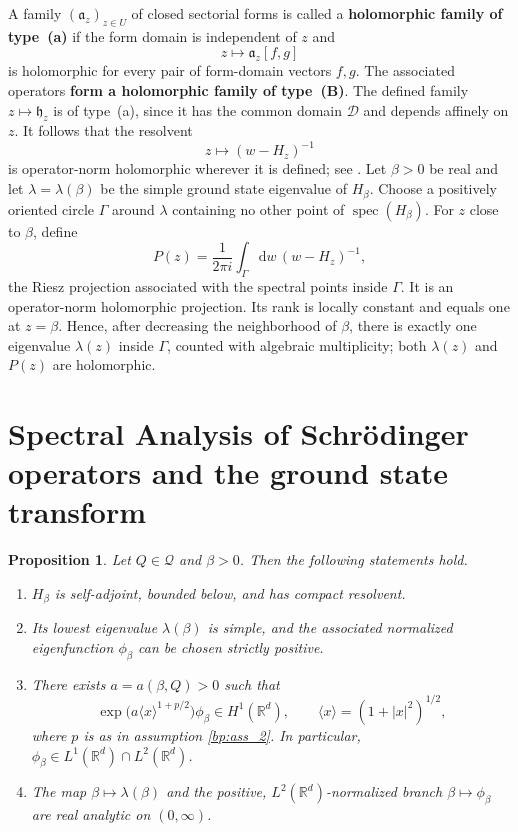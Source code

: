\documentclass[11pt,reqno]{amsart}
\newtheorem{proposition}[theorem]{Proposition}
\theoremstyle{definition}
\numberwithin{equation}{section}
\newcommand{\<}{\langle}
\renewcommand{\>}{\rangle}
\def\de{{\rm d}}
\def\de{{\mathrm {d}}}
\begin{document}
\begin{appendix}
A family $(\mathfrak a_z)_{z\in U}$ of closed sectorial forms is called a
\textbf{holomorphic family of type~(a)} if the form domain is independent of $z$ and
\[
       z\longmapsto\mathfrak a_z[f,g]
\]
is holomorphic for every pair of form-domain vectors $f,g$.  The associated
operators \textbf{form a holomorphic family of type~(B)}. 
The defined family $z\mapsto\mathfrak h_z$ is of type~(a), since it has the common
domain $\mathcal D$ and depends affinely on $z$.  It follows that the resolvent
\[
       z\longmapsto(w-H_z)^{-1}
\]
is operator-norm holomorphic wherever it is defined; see
\cite[Chapter~VII, Section~4]{Kato}.
Let $\beta>0$ be real and let $\lambda=\lambda(\beta)$ be the simple ground
state eigenvalue of $H_\beta$.  Choose a positively oriented circle $\Gamma$ around $\lambda$ containing no other point of
$\operatorname{spec}(H_\beta)$.  For $z$ close to $\beta$, define
\begin{equation}
       P(z)=\frac1{2\pi i}\int_\Gamma \de w \, (w-H_z)^{-1},
       \nonumber
\end{equation}
the Riesz projection associated with the spectral points inside
$\Gamma$.  It is an operator-norm holomorphic projection.  Its rank is locally constant and equals one at $z=\beta$.  Hence, after decreasing the
neighborhood of $\beta$, there is exactly one eigenvalue $\lambda(z)$ inside $\Gamma$, counted with algebraic multiplicity; both $\lambda(z)$ and $P(z)$ are holomorphic.



\section{Spectral Analysis of Schrödinger operators and the ground state transform}
\begin{proposition}
\label{prop:ground-state-spectral-theory}
Let $Q\in\mathcal Q$ and $\beta>0$. Then the following statements hold.
\begin{enumerate}
    \item[(a)] $H_\beta$ is self-adjoint, bounded below, and has compact
    resolvent.
    \item[(b)] Its lowest eigenvalue $\lambda(\beta)$ is simple, and the
    associated normalized eigenfunction $\phi_\beta$ can be chosen strictly
    positive.
    \item[(c)] There exists $a=a(\beta,Q)>0$ such that
    \[
        \exp\bigl(a\langle x\rangle^{1+p/2}\bigr)\phi_\beta
        \in H^1(\mathbb R^d),
        \qquad \langle x\rangle=(1+|x|^2)^{1/2},
    \]
    where $p$ is as in assumption \eqref{bp:ass_2}. In particular,
    $\phi_\beta\in L^1(\mathbb R^d)\cap L^2(\mathbb R^d)$.
    \item[(d)] The map $\beta\mapsto\lambda(\beta)$ and the positive,
    $L^2(\mathbb R^d)$-normalized branch $\beta\mapsto\phi_\beta$ are real analytic on
    $(0,\infty)$.
\end{enumerate}
\end{proposition}


\end{appendix}
\end{document}
